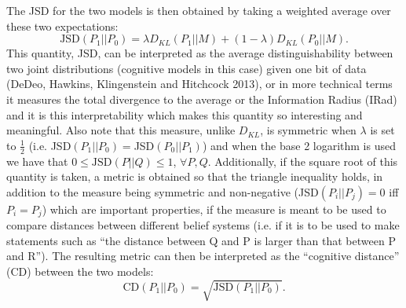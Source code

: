 \documentclass[12pt]{article}
\begin{document}
The JSD for the two models is then obtained by taking a weighted average over these two expectations:
\begin{equation} \label{eq:jsd}
\text{JSD}(P_1 | | P_0)=\lambda D_{KL}(P_1 | | M) + (1-\lambda) D_{KL}(P_0 | | M).
\end{equation}
This quantity, JSD, can be interpreted as the average distinguishability between two joint distributions (cognitive models in this case) given one bit of data (DeDeo, Hawkins, Klingenstein and Hitchcock 2013), or in more technical terms it measures the total divergence to the average or the Information Radius (IRad) and it is this interpretability which makes this quantity so interesting and meaningful. Also note that this measure, unlike $D_{KL}$, is symmetric when $\lambda$ is set to $\frac{1}{2}$ (i.e. JSD$(P_1 | | P_0)=$JSD$(P_0 | | P_1)$) and when the base 2 logarithm is used we have that $0 \leq \text{JSD}(P | | Q) \leq 1$, $\forall P, Q.$ Additionally, if the square root of this quantity is taken, a metric is obtained so that the triangle inequality holds, in addition to the measure being symmetric and non-negative (JSD$(P_i || P_j)=0$ iff $P_i=P_j$) which are important properties, if the measure is meant to be used to compare distances between different belief systems (i.e. if it is to be used to make statements such as ``the distance between Q and P is larger than that between P and R''). The resulting metric can then be interpreted as the ``cognitive distance'' (CD) between the two models:
\begin{equation} \label{eq:distance}
\text{CD}(P_1 || P_0)=\sqrt{\text{JSD}(P_1 || P_0)}.
\end{equation}
\end{document}
